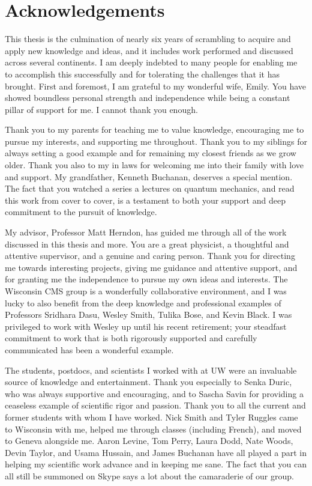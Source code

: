 \section{Acknowledgements}

This thesis is the culmination of nearly six years 
of scrambling to acquire and apply new knowledge and ideas,
and it includes work performed and discussed across several continents. 
I am deeply indebted to many people for enabling me to accomplish this
successfully and for tolerating the challenges that it has brought.
First and foremost, I am grateful
to my wonderful wife, Emily. You have showed boundless
personal strength and independence while being a constant pillar of 
support for me. I cannot thank you enough.

Thank you to my parents for teaching me to value knowledge,
encouraging me to pursue my interests, and supporting me throughout. Thank
you to my siblings for always setting a good example and for remaining 
my closest friends as we grow older.
Thank you also to my in laws for welcoming me into their family with love and support.
My grandfather, Kenneth Buchanan, deserves a special mention. 
The fact that you watched a series a lectures on quantum mechanics, 
and read this work from cover to cover, is a testament to both your support
and deep commitment to the pursuit of knowledge.

My advisor, Professor Matt Herndon, has guided me through all of the work discussed
in this thesis and more.
You are a great physicist, a thoughtful and attentive supervisor,
and a genuine and caring person. Thank you for directing me towards interesting
projects, giving me guidance and attentive support, and for 
granting me the independence to pursue my own ideas and interests.
The Wisconsin CMS group is a wonderfully collaborative environment,
and I was lucky to also benefit from the deep knowledge and professional examples
of Professors Sridhara Dasu, Wesley Smith, Tulika Bose, and Kevin Black. 
I was privileged to work with Wesley up until his recent retirement;
your steadfast commitment to work that is both rigorously
supported and carefully communicated has been a wonderful example.

The students, postdocs, and scientists I worked with at UW were an invaluable 
source of knowledge and entertainment. 
Thank you especially to Senka Duric, who was always supportive and
encouraging, and to 
Sascha Savin for providing a ceaseless example of scientific
rigor and passion.  
Thank you to all the current and former students with whom I have worked.
Nick Smith and Tyler Ruggles came to Wisconsin with me, 
helped me through classes (including French), and moved to Geneva
alongside me. Aaron Levine, Tom Perry, Laura Dodd, Nate Woods, Devin Taylor,
and Usama Hussain, and James Buchanan have all played a part in helping my
scientific work advance and in keeping me sane. The fact that you can all
still be summoned on Skype says a lot about the camaraderie of our group.

